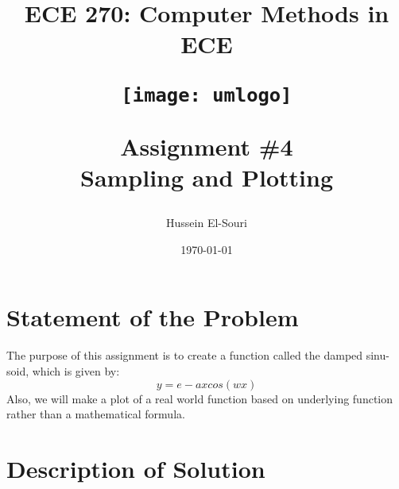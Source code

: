\documentclass[letterpaper, 24pt, final, onecolumn, titlepage] {article}
\title{ECE 270: Computer Methods in ECE \\
	\vspace{1.5cm}
   		\begin{center}\texttt{[image: umlogo]} \end{center}
	\vspace{1.5cm}
	\textbf{Assignment \#4} \\
	Sampling and Plotting}
\author{Hussein El-Souri}
\date{\today}
\begin{document}
\maketitle

\doublespacing

\section{Statement of the Problem}

The purpose of this assignment is to create a function called the damped sinu-soid, which is given by:\\
\begin{equation}y = e−axcos(wx)\end{equation}
Also, we will make a plot of a real world function based on underlying function rather than a mathematical formula.

\section{Description of Solution}
\end{document}
